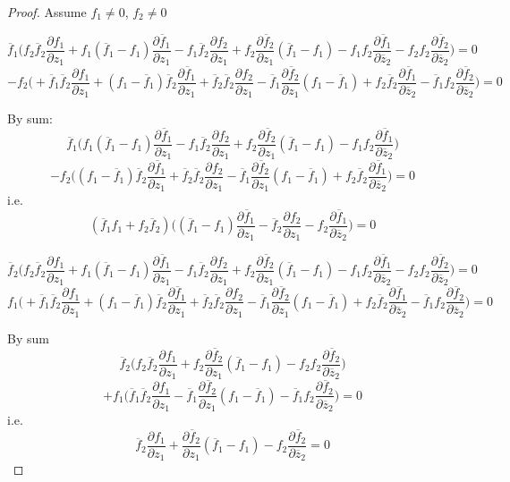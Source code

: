 \documentclass[12pt]{amsart}
\theoremstyle{definition}
\begin{document}
\begin{proof}
Assume $f_1\not =0$, $f_2\not =0$

$$
\overline f_1 \big(f_2\overline f_2\frac{\partial f_1}{\partial z_1} + f_1 (\overline f_1- f_1)\frac{\partial\overline f_1}{\partial z_1}-f_1\overline f_2\frac{\partial f_2}{\partial z_1} + f_2\frac{\partial\overline f_2}{\partial z_1}(\overline f_1-f_1) -f_1f_2\frac{\partial \overline f_1}{\partial\overline z_2}-f_2f_2\frac{\partial\overline f_2}{\partial\overline z_2}\big)=0
$$
$$
-f_2\big(+\overline f_1\overline f_2\frac{\partial f_1}{\partial z_1}+ (f_1-\overline f_1)\overline f_2\frac{\partial\overline f_1}{\partial z_1}+
\overline f_2\overline f_2\frac{\partial f_2}{\partial z_1}
-\overline f_1\frac{\partial\overline f_2}{\partial z_1}(f_1-\overline f_1)+f_2\overline f_2\frac{\partial\overline f_1}{\partial \overline z_2}-\overline f_1 f_2\frac{\partial\overline f_2}{\partial\overline z_2}\big)=0
$$ 

By sum:
$$
\overline f_1 \big( f_1 (\overline f_1- f_1)\frac{\partial\overline f_1}{\partial z_1}-f_1\overline f_2\frac{\partial f_2}{\partial z_1} + f_2\frac{\partial\overline f_2}{\partial z_1}(\overline f_1-f_1) -f_1f_2\frac{\partial \overline f_1}{\partial\overline z_2}\big)
$$
$$
-f_2\big((f_1-\overline f_1)\overline f_2\frac{\partial\overline f_1}{\partial z_1}+
\overline f_2\overline f_2\frac{\partial f_2}{\partial z_1}
-\overline f_1\frac{\partial\overline f_2}{\partial z_1}(f_1-\overline f_1)+f_2\overline f_2\frac{\partial\overline f_1}{\partial \overline z_2}\big)=0
$$
i.e. 
$$
(\overline f_1f_1+f_2\overline f_2)\big ( (\overline f_1- f_1)\frac{\partial\overline f_1}{\partial z_1}-\overline f_2\frac{\partial f_2}{\partial z_1}-f_2\frac{\partial\overline f_1}{\partial \overline z_2}\big )=0
$$

$$
\overline f_2 \big(f_2\overline f_2\frac{\partial f_1}{\partial z_1} + f_1 (\overline f_1- f_1)\frac{\partial\overline f_1}{\partial z_1}-f_1\overline f_2\frac{\partial f_2}{\partial z_1} + f_2\frac{\partial\overline f_2}{\partial z_1}(\overline f_1-f_1) -f_1f_2\frac{\partial \overline f_1}{\partial\overline z_2}-f_2f_2\frac{\partial\overline f_2}{\partial\overline z_2}\big)=0
$$
$$
f_1\big(+\overline f_1\overline f_2\frac{\partial f_1}{\partial z_1}+ (f_1-\overline f_1)\overline f_2\frac{\partial\overline f_1}{\partial z_1}+
\overline f_2\overline f_2\frac{\partial f_2}{\partial z_1}
-\overline f_1\frac{\partial\overline f_2}{\partial z_1}(f_1-\overline f_1)+f_2\overline f_2\frac{\partial\overline f_1}{\partial \overline z_2}-\overline f_1 f_2\frac{\partial\overline f_2}{\partial\overline z_2}\big)=0
$$ 

By sum
$$
\overline f_2 \big(f_2\overline f_2\frac{\partial f_1}{\partial z_1} + f_2\frac{\partial\overline f_2}{\partial z_1}(\overline f_1-f_1) -f_2f_2\frac{\partial\overline f_2}{\partial\overline z_2}\big) 
$$
$$
+f_1\big(\overline f_1\overline f_2\frac{\partial f_1}{\partial z_1}
-\overline f_1\frac{\partial\overline f_2}{\partial z_1}(f_1-\overline f_1)-\overline f_1 f_2\frac{\partial\overline f_2}{\partial\overline z_2}\big)=0
$$ 
i.e.
$$
\overline f_2\frac{\partial f_1}{\partial z_1}+ \frac{\partial\overline f_2}{\partial z_1}(\overline f_1-f_1)-f_2\frac{\partial\overline f_2}{\partial\overline z_2}=0 
$$
\end{proof}
\end{document}
